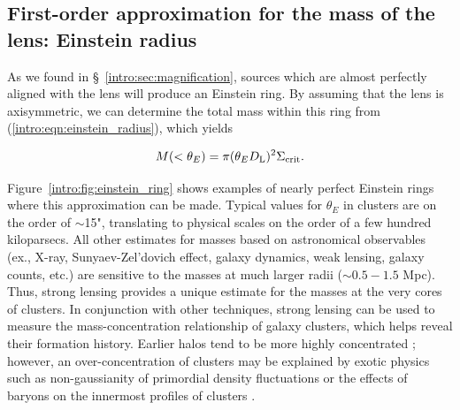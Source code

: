 \subsection{First-order approximation for the mass of the lens: Einstein radius}

As we found in \S~\ref{intro:sec:magnification}, sources which are almost perfectly aligned with the lens will produce an Einstein ring. By assuming that the lens is axisymmetric, we can determine the total mass within this ring from (\ref{intro:eqn:einstein_radius}), which yields

\begin{equation}
M(<\theta_E) = \pi (\theta_E D_\mathrm{L})^2 \Sigma_\mathrm{crit}.
\label{intro:eqn:einstein_mass}
\end{equation}

Figure~\ref{intro:fig:einstein_ring} shows examples of nearly perfect Einstein rings where this approximation can be made. Typical values for $\theta_E$ in clusters are on the order of $\sim$15", translating to physical scales on the order of a few hundred kiloparsecs. All other estimates for masses based on astronomical observables (ex., X-ray, Sunyaev-Zel'dovich effect, galaxy dynamics, weak lensing, galaxy counts, etc.) are sensitive to the masses at much larger radii ($\sim0.5-1.5$ Mpc). Thus, strong lensing provides a unique estimate for the masses at the very cores of clusters. In conjunction with other techniques, strong lensing can be used to measure the mass-concentration relationship of galaxy clusters, which helps reveal their formation history. Earlier halos tend to be more highly concentrated \citep[e.g., ][]{Wechsler:2002rz}; however, an over-concentration of clusters may be explained by exotic physics such as non-gaussianity of primordial density fluctuations \citep{Fedeli:2007sf,Mathis:2004ty} or the effects of baryons on the innermost profiles of clusters \citep{Rozo:2008mz}.

